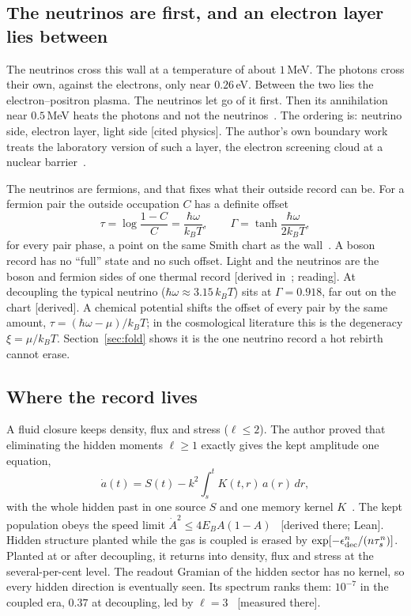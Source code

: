 \documentclass[11pt]{article}
\theoremstyle{definition}\newtheorem{hypothesis}{Hypothesis}\newtheorem{prediction}{Prediction}
\theoremstyle{remark}\newtheorem{remark}[theorem]{Remark}
\newcommand{\grade}[1]{\textsf{\small[#1]}}
\begin{document}
\subsection{The neutrinos are first, and an electron layer lies between}
The neutrinos cross this wall at a temperature of about $1$\,MeV. The photons cross their own, against the electrons, only near $0.26$\,eV. Between the two lies the electron--positron plasma. The neutrinos let go of it first. Then its annihilation near $0.5$\,MeV heats the photons and not the neutrinos~\cite{Dolgov}. The ordering is: neutrino side, electron layer, light side \grade{cited physics}. The author's own boundary work treats the laboratory version of such a layer, the electron screening cloud at a nuclear barrier~\cite{Screen}.

The neutrinos are fermions, and that fixes what their outside record can be. For a fermion pair the outside occupation $C$ has a definite offset
\begin{equation}
\tau=\log\frac{1-C}{C}=\frac{\hbar\omega}{k_BT},\qquad \Gamma=\tanh\frac{\hbar\omega}{2k_BT},
\end{equation}
for every pair phase, a point on the same Smith chart as the wall~\cite{BH,Offset}. A boson record has no ``full'' state and no such offset. Light and the neutrinos are the boson and fermion sides of one thermal record \grade{derived in~\cite{BH}; reading}. At decoupling the typical neutrino ($\hbar\omega\approx3.15\,k_BT$) sits at $\Gamma=0.918$, far out on the chart \grade{derived}. A chemical potential shifts the offset of every pair by the same amount, $\tau=(\hbar\omega-\mu)/k_BT$; in the cosmological literature this is the degeneracy $\xi=\mu/k_BT$. Section~\ref{sec:fold} shows it is the one neutrino record a hot rebirth cannot erase.

\subsection{Where the record lives}
A fluid closure keeps density, flux and stress ($\ell\le2$). The author proved that eliminating the hidden moments $\ell\ge1$ exactly gives the kept amplitude one equation,
\begin{equation}
\dot a(t)=S(t)-k^2\!\int_s^tK(t,r)\,a(r)\,dr,
\end{equation}
with the whole hidden past in one source $S$ and one memory kernel $K$~\cite{NU10}. The kept population obeys the speed limit $\dot A^2\le4E_BA(1-A)$~\cite{NU10} \grade{derived there; Lean}. Hidden structure planted while the gas is coupled is erased by $\exp[-\epsilon_{\rm dec}^n/(n\tau_s^n)]$. Planted at or after decoupling, it returns into density, flux and stress at the several-per-cent level. The readout Gramian of the hidden sector has no kernel, so every hidden direction is eventually seen. Its spectrum ranks them: $10^{-7}$ in the coupled era, $0.37$ at decoupling, led by $\ell=3$~\cite{NU10} \grade{measured there}.
\end{document}
